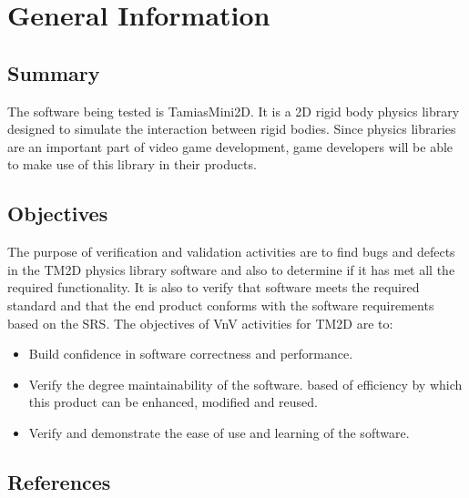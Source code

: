 \documentclass[12pt, titlepage]{article}
\begin{document}
\section{General Information}

\subsection{Summary}
The software being tested is TamiasMini2D. It is a 2D rigid body physics library designed to simulate the interaction between rigid bodies. Since physics libraries are an important part of video game development, game developers will be able to make use of this library in their products.

\subsection{Objectives}

The purpose of verification and validation activities are to find bugs and defects in the TM2D physics library software and also to determine if it has met all the required functionality. It is also to verify that software meets the required standard and that the end product conforms with the software requirements based on the SRS. The objectives of VnV activities for TM2D are to:
  \begin{itemize}
	\item Build confidence in software correctness and performance.
	\item Verify the degree maintainability of the software.
	  based of efficiency by which this product can be enhanced, modified
	  and reused.
	\item Verify and demonstrate the ease of use and learning of the software.
  \end{itemize}
	


\subsection{References}
\end{document}
